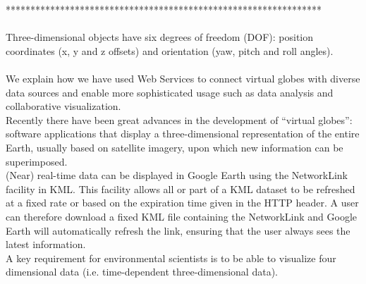 ****************************************************************\\%
\parencite{mazuryk.virtual-reality.1996}\\
Three-dimensional objects have six degrees of freedom (DOF): position coordinates (x, y and z offsets) and orientation (yaw, pitch and roll angles).\\

\parencite{blower.sharing-visualizing.2007}\\
We explain how we have used Web Services to connect virtual globes with diverse data sources and enable more sophisticated usage such as data analysis and collaborative visualization.\\
Recently there have been great advances in the development of “virtual globes”: software applications that display a three-dimensional representation of the entire Earth, usually based on satellite imagery, upon which new information can be superimposed.\\
(Near) real-time data can be displayed in Google Earth using the NetworkLink facility in KML. This facility allows all or part of a KML dataset to be refreshed at a fixed rate or based on the expiration time given in the HTTP header. A user can therefore download a fixed KML file containing the NetworkLink and Google Earth will automatically refresh the link, ensuring that the user always sees the latest information.\\
A key requirement for environmental scientists is to be able to visualize four dimensional data (i.e. time-dependent three-dimensional data).\\

